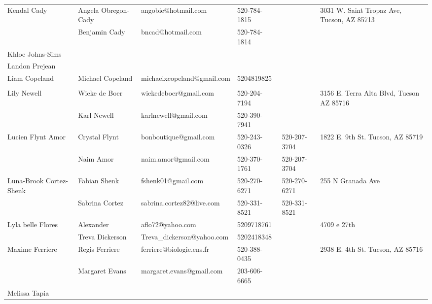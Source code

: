 \documentclass[landscape]{article}\usepackage[]{graphicx}\usepackage[]{color}
\begin{document}
\begin{longtable}{|p{100pt}|p{100pt}|p{140pt}|p{60pt}|p{64pt}|p{120pt}|}
 &  &  &  &  & \\
\hline
\multirow{2}{100pt}{Kendal Cady} & Angela Obregon-Cady & angobie@hotmail.com & 520-784-1815 &  & \multirow{2}{120pt}{3031 W. Saint Tropaz Ave, Tucson, AZ 85713} \\
 & Benjamin Cady & bncad@hotmail.com & 520-784-1814 &  & \\
\hline
\multirow{2}{100pt}{Khloe Johns-Sims} &  &  &  &  & \multirow{2}{120pt}{} \\
 &  &  &  &  & \\
\hline
\multirow{2}{100pt}{Landon Prejean} &  &  &  &  & \multirow{2}{120pt}{} \\
 &  &  &  &  & \\
\hline
\multirow{2}{100pt}{Liam Copeland} & Michael Copeland & michaelxcopeland@gmail.com & 5204819825 &  & \multirow{2}{120pt}{} \\
 &  &  &  &  & \\
\hline
\multirow{2}{100pt}{Lily Newell} & Wieke de Boer & wiekedeboer@gmail.com & 520-204-7194 &  & \multirow{2}{120pt}{3156 E. Terra Alta Blvd, Tucson AZ 85716} \\
 & Karl Newell & karlnewell@gmail.com & 520-390-7941 &  & \\
\hline
\multirow{2}{100pt}{Lucien Flynt Amor} & Crystal Flynt & bonboutique@gmail.com & 520-243-0326 & 520-207-3704 & \multirow{2}{120pt}{1822 E. 9th St. Tucson, AZ 85719} \\
 & Naim Amor & naim.amor@gmail.com & 520-370-1761 & 520-207-3704 & \\
\hline
\multirow{2}{100pt}{Luna-Brook Cortez-Shenk} & Fabian Shenk & fshenk01@gmail.com & 520-270-6271 & 520-270-6271 & \multirow{2}{120pt}{255 N Granada Ave} \\
 & Sabrina Cortez & sabrina.cortez82@live.com & 520-331-8521 & 520-331-8521 & \\
\hline
\multirow{2}{100pt}{Lyla belle Flores} & Alexander  & aflo72@yahoo.com & 5209718761 &  & \multirow{2}{120pt}{4709 e 27th} \\
 & Treva Dickerson & Treva\_dickerson@yahoo.com & 5202418348 &  & \\
\hline
\multirow{2}{100pt}{Maxime Ferriere} & Regis Ferriere & ferriere@biologie.ens.fr & 520-388-0435 &  & \multirow{2}{120pt}{2938 E. 4th St. Tucson, AZ 85716} \\
 & Margaret Evans & margaret.evans@gmail.com & 203-606-6665 &  & \\
\hline
\multirow{2}{100pt}{Melissa Tapia} &  &  &  &  & \multirow{2}{120pt}{} \\

\end{longtable}
\end{document}

